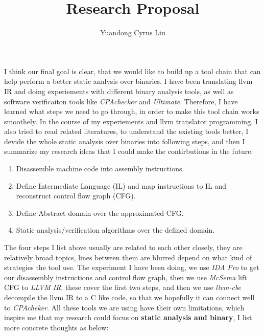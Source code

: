 \documentclass{article}
\begin{document}
\author{Yuandong Cyrus Liu}
\title{Research Proposal}

\maketitle{} %

    I think our final goal is clear, that we would like to build up a tool chain that can help perform a better static analysis over binaries. I have been translating llvm IR and doing experiements with different binary analysis tools, as well as software verificaiton tools like \emph{CPAchecker} and \emph{Ultimate}. Therefore, I have learned what steps we need to go through, in order to make this tool chain works smoothely. In the course of my experiements and llvm translator programming, I also tried to read related literatures, to understand the existing tools better, I devide the whole static analysis over binaries into following steps, and then I summarize my research ideas that I could make the contirbutions in the future.
\begin{enumerate}
    \item
        Disassemble machine code into assembly instructions.
    \item
        Define Intermediate Language (IL) and map instructions to IL and reconstruct control flow graph (CFG).
    \item
        Define Abstract domain over the approximated CFG.
    \item
        Static analysis/verification algorithms over the defined domain.
\end{enumerate}
    The four steps I list above usually are related to each other closely, they are relatively broad topics, lines between them are blurred depend on what kind of strategies the tool use. The experiment I have been doing, we use \emph{IDA Pro} to get our disassembly instructions and control flow graph, then we use \emph{McSema} lift CFG to \emph{LLVM IR}, these cover the first two steps, and then we use \emph{llvm-cbe} decompile the llvm IR to a C like code, so that we hopefully it can
    connect well to \emph{CPAcheker}. All these tools we are using have their own limitations, which inspire me that my research could focus on \textbf{static analysis and binary}, I list more concrete thoughts as below:
\end{document}
